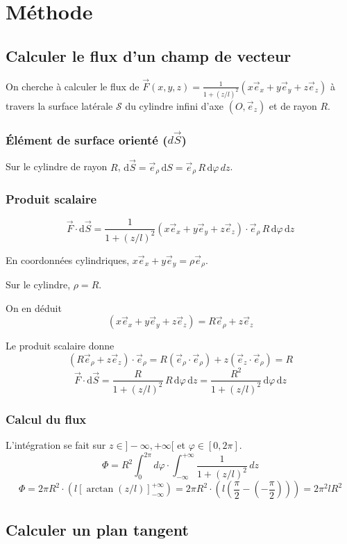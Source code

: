 \documentclass[french]{yLectureNote}
\renewcommand{\vec}{\overrightarrow}
\newcommand{\dd}{\mathrm{d}}
\begin{document}
\section{Méthode}
\subsection{Calculer le flux d'un champ de vecteur}
On cherche à calculer le flux de $\vec{F}(x,y,z)=\frac{1}{1+(z/l)^{2}}(x\vec{e}_{x}+y\vec{e}_{y}+z\vec{e}_{z})$ à travers la surface latérale $\mathcal{S}$ du cylindre infini d'axe $(O, \vec{e}_z)$ et de rayon $R$.
\subsubsection{Élément de surface orienté ($d\vec{S}$)}
Sur le cylindre de rayon $R$, $\dd\vec{S} = \vec{e}_\rho \, \dd S = \vec{e}_\rho \, R \, \dd\varphi \, dz$.
\subsubsection{Produit scalaire}
    $$\vec{F} \cdot \dd\vec{S} = \frac{1}{1+(z/l)^{2}} (x\vec{e}_{x}+y\vec{e}_{y}+z\vec{e}_{z}) \cdot \vec{e}_\rho \, R \, \dd\varphi \, \dd z$$

    En coordonnées cylindriques, $x\vec{e}_{x}+y\vec{e}_{y} = \rho \vec{e}_\rho$.

    Sur le cylindre, $\rho=R$.

    On en déduit
    $$(x\vec{e}_{x}+y\vec{e}_{y}+z\vec{e}_{z}) = R\vec{e}_{\rho} + z\vec{e}_{z}$$

    Le produit scalaire donne
    $$(R\vec{e}_{\rho} + z\vec{e}_{z}) \cdot \vec{e}_\rho = R(\vec{e}_{\rho}\cdot\vec{e}_{\rho}) + z(\vec{e}_{z}\cdot\vec{e}_{\rho}) = R$$
    $$\vec{F} \cdot \dd\vec{S} = \frac{R}{1+(z/l)^{2}} \, R \, \dd\varphi \, \dd z = \frac{R^2}{1+(z/l)^{2}} \, \dd\varphi \, \dd z$$
\subsubsection{Calcul du flux}
L'intégration se fait sur $z \in ]-\infty, +\infty[$ et $\varphi \in [0, 2\pi]$.
    $$\Phi = R^2 \int_{0}^{2\pi} d\varphi \cdot \int_{-\infty}^{+\infty} \frac{1}{1+(z/l)^{2}} \, dz$$
    $$\Phi = 2\pi R^2 \cdot (l [\arctan(z/l)]_{-\infty}^{+\infty}) = 2\pi R^2 \cdot (l (\frac{\pi}{2} - (-\frac{\pi}{2}))) =  2\pi^2 l R^2$$
\subsection{Calculer un plan tangent}
\end{document}
